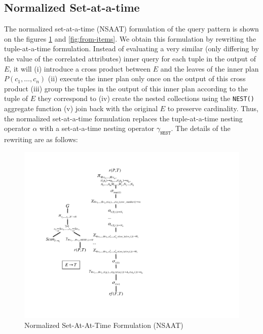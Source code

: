 \subsection{Normalized Set-at-a-time \label{sec:NSAAT}}

The normalized set-at-a-time (NSAAT) formulation of the query pattern is shown on the figures \ref{fig:R2} and \ref{fig:from-items}. We obtain this formulation by rewriting the tuple-at-a-time formulation. Instead of evaluating a very similar (only differing by the value of the correlated attributes) inner query for each tuple in the output of $E$, it will (i) introduce a cross product between $E$ and the leaves of the inner plan $P(c_1, \dots, c_n)$ (ii) execute the inner plan only once on the output of this cross product (iii) group the tuples in the output of this inner plan according to the tuple of $E$ they correspond to (iv) create the nested collections using the \texttt{NEST()} aggregate function (v) join back with the original $E$ to preserve cardinality. Thus, the normalized set-at-a-time formulation replaces the tuple-at-a-time nesting operator $\alpha$ with a set-at-a-time nesting operator $\gamma_{\texttt{NEST}}$. The details of the rewriting are as follows:

\begin{figure}[h]
\centering
\caption{Normalized Set-At-At-Time Formulation (NSAAT) \label{fig:R2}}
\includegraphics[width=\linewidth]{images/R2.pdf}
\end{figure}

